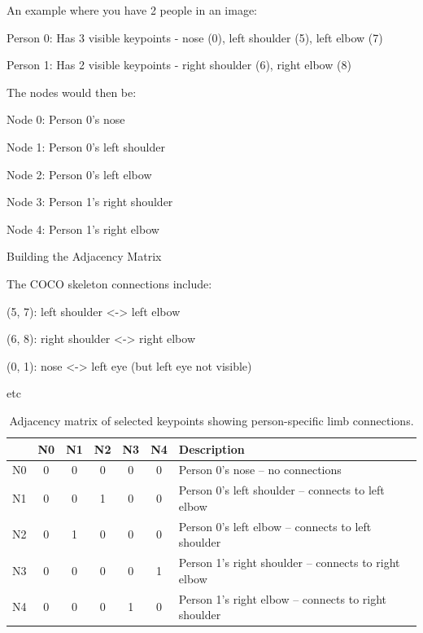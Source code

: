 An example where you have 2 people in an image: 
\begin{compactitem}
   \item Person 0: Has 3 visible keypoints - nose (0), left shoulder (5), left elbow (7)
   \item Person 1: Has 2 visible keypoints - right shoulder (6), right elbow (8)
\end{compactitem}

The nodes would then be: 
\begin{compactitem}
\item Node 0: Person 0's nose
\item Node 1: Person 0's left shoulder
\item Node 2: Person 0's left elbow
\item Node 3: Person 1's right shoulder
\item Node 4: Person 1's right elbow
\end{compactitem}

Building the Adjacency Matrix

The COCO skeleton connections include:
\begin{compactitem}
   \item (5, 7): left shoulder <-> left elbow
   \item (6, 8): right shoulder <-> right elbow
   \item (0, 1): nose <-> left eye (but left eye not visible)
   \item etc
\end{compactitem}

\begin{table}[H]
\centering
\caption{Adjacency matrix of selected keypoints showing person-specific limb connections.}
\begin{tabular}{c|ccccc@{\hskip 1em}|@{\hskip 1em}l}
     & N0 & N1 & N2 & N3 & N4 & Description \\
\hline
N0 & 0  & 0  & 0  & 0  & 0  & Person 0's nose -- no connections \\
N1 & 0  & 0  & 1  & 0  & 0  & Person 0's left shoulder -- connects to left elbow \\
N2 & 0  & 1  & 0  & 0  & 0  & Person 0's left elbow -- connects to left shoulder \\
N3 & 0  & 0  & 0  & 0  & 1  & Person 1's right shoulder -- connects to right elbow \\
N4 & 0  & 0  & 0  & 1  & 0  & Person 1's right elbow -- connects to right shoulder \\
\end{tabular}
\label{tab:keypoint_adjacency}
\end{table}

